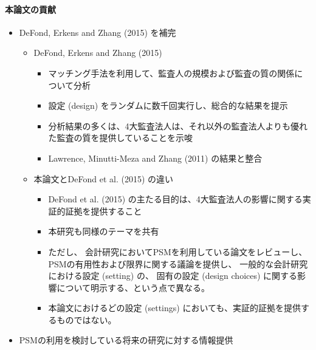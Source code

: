 \paragraph{本論文の貢献}
\begin{itemize}
 \item DeFond, Erkens and Zhang (2015) を補完
       \begin{itemize}
        \item DeFond, Erkens and Zhang (2015)
              \begin{itemize}
               \item マッチング手法を利用して、監査人の規模および監査の質の関係について分析
               \item 設定 (design) をランダムに数千回実行し、総合的な結果を提示
               \item 分析結果の多くは、4大監査法人は、それ以外の監査法人よりも優れた監査の質を提供していることを示唆
               \item Lawrence, Minutti-Meza and Zhang (2011) の結果と整合
              \end{itemize}
        \item 本論文とDeFond et al. (2015) の違い
              \begin{itemize}
               \item DeFond et al. (2015) の主たる目的は、4大監査法人の影響に関する実証的証拠を提供すること
               \item 本研究も同様のテーマを共有
               \item ただし、
                     会計研究においてPSMを利用している論文をレビューし、
                     PSMの有用性および限界に関する議論を提供し、
                     一般的な会計研究における設定 (setting) の、
                     固有の設定 (design choices) に関する影響について明示する、という点で異なる。
               \item 本論文におけるどの設定 (settings) においても、実証的証拠を提供するものではない。
              \end{itemize}
       \end{itemize}
 \item PSMの利用を検討している将来の研究に対する情報提供
\end{itemize}

